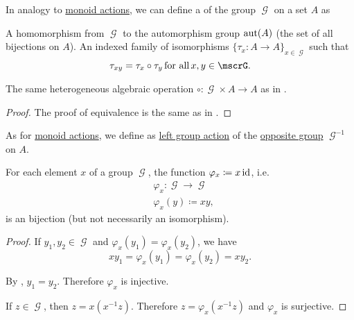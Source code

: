 \begin{definition}\label{def:left_group_action}
  In analogy to \hyperref[def:left_monoid_action]{monoid actions}, we can define a  of the group \( \mscrG \) on a set \( A \) as
  \begin{thmenum}
     A homomorphism from \( \mscrG \) to the automorphism group \( \operatorname{aut}(A) \) (the set of all bijections on \( A \)).
     An indexed family of isomorphisms \( \{ \tau_x: A \to A \}_{x \in \mscrG} \) such that
    \begin{equation}\label{eq:def:left_group_action/indirect_homomorphism}
      \tau_{xy} = \tau_x \circ \tau_y \T{for all} x, y \in \mscrG.
    \end{equation}

     The same heterogeneous algebraic operation \( \circ: \mscrG \times A \to A \) as in .
  \end{thmenum}
\end{definition}
\begin{proof}
  The proof of equivalence is the same as in .
\end{proof}

\begin{definition}\label{def:right_group_action}
  As for \hyperref[def:right_monoid_action]{monoid actions}, we define  as \hyperref[def:left_group_action]{left group action} of the \hyperref[def:magma/opposite]{opposite group} \( \mscrG^{-1} \) on \( A \).
\end{definition}

\begin{lemma}\label{thm:group_multiplication_is_bijection}
  For each element \( x \) of a group \( \mscrG \), the function \( \varphi_x \coloneqq x\operatorname{id} \), i.e.
  \begin{align*}
    &\varphi_x: \mscrG \to \mscrG \\
    &\varphi_x(y) \coloneqq xy,
  \end{align*}
  is an bijection (but not necessarily an isomorphism).
\end{lemma}
\begin{proof}
   If \( y_1, y_2 \in \mscrG \) and \( \varphi_x(y_1) = \varphi_x(y_2) \), we have
  \begin{equation*}
    xy_1 = \varphi_x(y_1) = \varphi_x(y_2) = xy_2.
  \end{equation*}

  By , \( y_1 = y_2 \). Therefore \( \varphi_x \) is injective.

   If \( z \in \mscrG \), then \( z = x(x^{-1} z) \). Therefore \( z = \varphi_x(x^{-1} z) \) and \( \varphi_x \) is surjective.
\end{proof}

